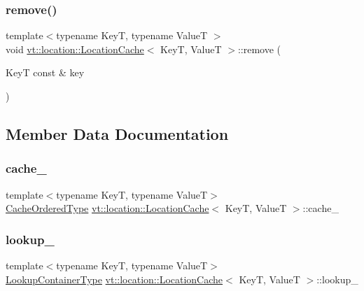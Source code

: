 \subsubsection{\texorpdfstring{remove()}{remove()}}
{\footnotesize\ttfamily template$<$typename KeyT, typename ValueT $>$ \\
void \hyperlink{structvt_1_1location_1_1_location_cache}{vt\+::location\+::\+Location\+Cache}$<$ KeyT, ValueT $>$\+::remove (\begin{DoxyParamCaption}\item[{KeyT const \&}]{key }\end{DoxyParamCaption})}



\subsection{Member Data Documentation}
\mbox{\label{structvt_1_1location_1_1_location_cache_a5bc8fbc8010517ed45b022633af26de9}} 
\subsubsection{\texorpdfstring{cache\+\_\+}{cache\_}}
{\footnotesize\ttfamily template$<$typename KeyT, typename ValueT$>$ \\
\hyperlink{structvt_1_1location_1_1_location_cache_aee11ea8af838d172e1834a9d0293b28d}{Cache\+Ordered\+Type} \hyperlink{structvt_1_1location_1_1_location_cache}{vt\+::location\+::\+Location\+Cache}$<$ KeyT, ValueT $>$\+::cache\+\_\+\hspace{0.3cm}{\ttfamily [private]}}

\mbox{\label{structvt_1_1location_1_1_location_cache_a66ca0e925c2fe39cbe1f309159094c96}} 
\subsubsection{\texorpdfstring{lookup\+\_\+}{lookup\_}}
{\footnotesize\ttfamily template$<$typename KeyT, typename ValueT$>$ \\
\hyperlink{structvt_1_1location_1_1_location_cache_af56948d938dcc38705b777a96b3100be}{Lookup\+Container\+Type} \hyperlink{structvt_1_1location_1_1_location_cache}{vt\+::location\+::\+Location\+Cache}$<$ KeyT, ValueT $>$\+::lookup\+\_\+\hspace{0.3cm}{\ttfamily [private]}}

